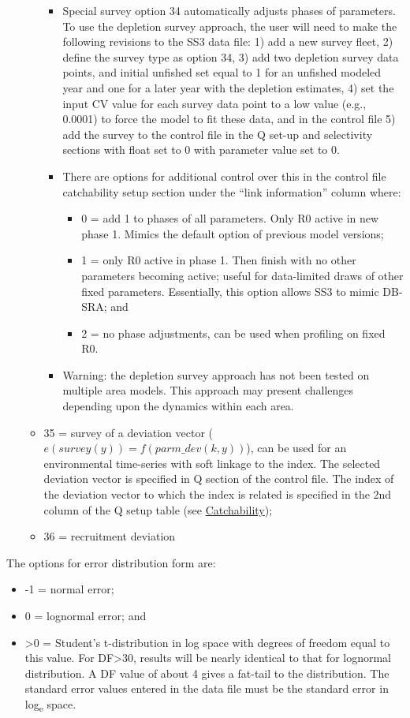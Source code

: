 \begin{itemize}
\begin{itemize}
			\begin{itemize}
				\item Special survey option 34 automatically adjusts phases of parameters. To use the depletion survey approach, the user will need to make the following revisions to the SS3 data file: 1) add a new survey fleet, 2) define the survey type as option 34, 3) add two depletion survey data points, and initial unfished set equal to 1 for an unfished modeled year and one for a later year with the depletion estimates, 4) set the input CV value for each survey data point to a low value (e.g., 0.0001) to force the model to fit these data, and in the control file 5) add the survey to the control file in the Q set-up and selectivity sections with float set to 0 with parameter value set to 0. 
				\item There are options for additional control over this in the control file catchability setup section under the ``link information'' column where:
				\begin{itemize}
				    \item 0 = add 1 to phases of all parameters. Only R0 active in new phase 1. Mimics the default option of previous model versions;
				    \item 1 = only R0 active in phase 1. Then finish with no other parameters becoming active; useful for data-limited draws of other fixed parameters. Essentially, this option allows SS3 to mimic DB-SRA; and
				    \item 2 = no phase adjustments, can be used when profiling on fixed R0.
				\end{itemize}
				\item Warning: the depletion survey approach has not been tested on multiple area models. This approach may present challenges depending upon the dynamics within each area.
			\end{itemize}
			\item 35 = survey of a deviation vector ($e(survey(y)) = f(parm\_dev(k,y))$), can be used for an environmental time-series with soft linkage to the index. The selected deviation vector is specified in Q section of the control file. The index of the deviation vector to which the index is related is specified in the 2nd column of the Q setup table (see \hyperlink{Qsetup}{Catchability});
			\item 36 = recruitment deviation
		\end{itemize}
	\end{itemize}

The options for error distribution form are:
	\begin{itemize}
		\item -1 = normal error;
		\item  0 = lognormal error; and 
		\item >0 = Student's t-distribution in log space with degrees of freedom equal to this value. For DF>30, results will be nearly identical to that for lognormal distribution. A DF value of about 4 gives a fat-tail to the distribution. The standard error values entered in the data file must be the standard error in log\textsubscript{e} space.
	\end{itemize}

